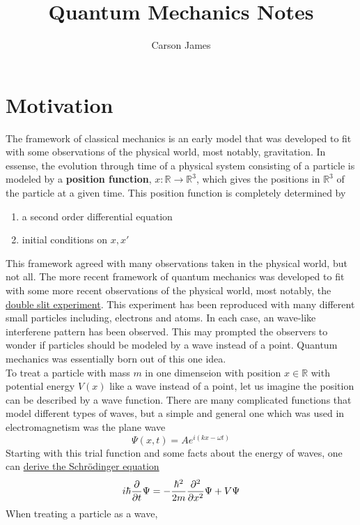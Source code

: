 \documentclass[12pt]{amsart}
\newcommand{\sch}{Schr\"{o}dinger }
\newcommand{\om}{\omega}
\newcommand{\R}{\mathbb{R}}
\begin{document}
\title{Quantum Mechanics Notes}
\author[James]{Carson James}
\maketitle


\tableofcontents

\section{Motivation}
The framework of classical mechanics is an early model that was developed to fit with some observations of the physical world, most notably, gravitation. In essense, the evolution through time of a physical system consisting of a particle is modeled by a \textbf{position function}, $x:\R \rightarrow \R^{3}$, which gives the positions in $\R^3$ of the particle at a given time. This position function is completely determined by
\begin{enumerate}
	\item a second order differential equation
	\item initial conditions on $x, x'$
\end{enumerate}
This framework agreed with many observations taken in the physical world, but not all. The more recent framework of quantum mechanics was developed to fit with some more recent observations of the physical world, most notably, the \href{https://en.wikipedia.org/wiki/Double-slit_experiment}{double slit experiment}. This experiment has been reproduced with many different small particles including, electrons and atoms. In each case, an wave-like interferene pattern has been observed. This may prompted the observers to wonder if particles should be modeled by a wave instead of a point. Quantum mechanics was essentially born out of this one idea. \vspace{.5cm} \\
To treat a particle with mass $m$ in one dimenseion with position $x \in \R$ with potential  energy $V(x)$ like a wave instead of a point, let us imagine the position can be described by a wave function. There are many complicated functions that model different types of waves, but a simple and general one which was used in electromagnetism was the plane wave $$\Psi(x,t) = Ae^{i(k x - \om t)}$$ Starting with this trial function and some facts about the energy of waves, one can \href{https://www.youtube.com/watch?v=IsX5iUKNT2k}{derive the \sch equation} $$i\hbar \pdv{t} \Psi =  -\frac{\hbar^2}{2m} \pdv[2]{x} \Psi + V \Psi$$
When treating a particle as a wave, 
\end{document}

